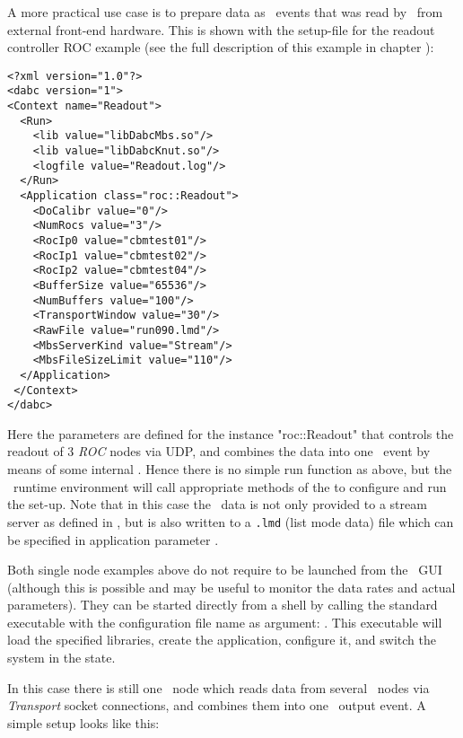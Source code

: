 A more practical use case is to prepare data as \mbs\ events that was
read by \dabc\ from external front-end hardware. This is shown with the
setup-file for the readout controller ROC example
(see the full description of this example in chapter ):

\begin{small}
\begin{verbatim}
<?xml version="1.0"?>
<dabc version="1">
<Context name="Readout">
  <Run>
    <lib value="libDabcMbs.so"/>
    <lib value="libDabcKnut.so"/>
    <logfile value="Readout.log"/>
  </Run>
  <Application class="roc::Readout">
    <DoCalibr value="0"/>
    <NumRocs value="3"/>
    <RocIp0 value="cbmtest01"/>
    <RocIp1 value="cbmtest02"/>
    <RocIp2 value="cbmtest04"/>
    <BufferSize value="65536"/>
    <NumBuffers value="100"/>
    <TransportWindow value="30"/>
    <RawFile value="run090.lmd"/>
    <MbsServerKind value="Stream"/>
    <MbsFileSizeLimit value="110"/>
  </Application>
 </Context>
</dabc>
\end{verbatim}
\end{small}

Here the parameters are defined for the  instance
"roc::Readout" that controls  the readout of 3 {\em ROC} nodes via UDP, 
and combines the data into one \mbs\ event by means of some internal
. Hence there is no simple
run function as above, but the \dabc\ runtime environment will call
appropriate methods of the  to configure and run
the set-up. Note that in this case the \mbs\ data is not only provided to a
stream server as defined in , but is also
written to a {\tt *.lmd} (list mode data) file which can be specified
in application parameter .

Both single node examples above do not require to be launched from the \dabc\ GUI (although this is possible and may be useful to monitor the data rates and actual parameters).
They can be started directly from a shell 
by calling the standard 
executable with the configuration file name as argument:
. 
This executable will load the specified libraries,
create the application, configure it, and switch the system in 
the  state.   


In this case there is still one \dabc\ node which reads data from several
\mbs\ nodes via {\em Transport} socket connections, and combines them
into one \mbs\ output event. A simple setup looks like this:

